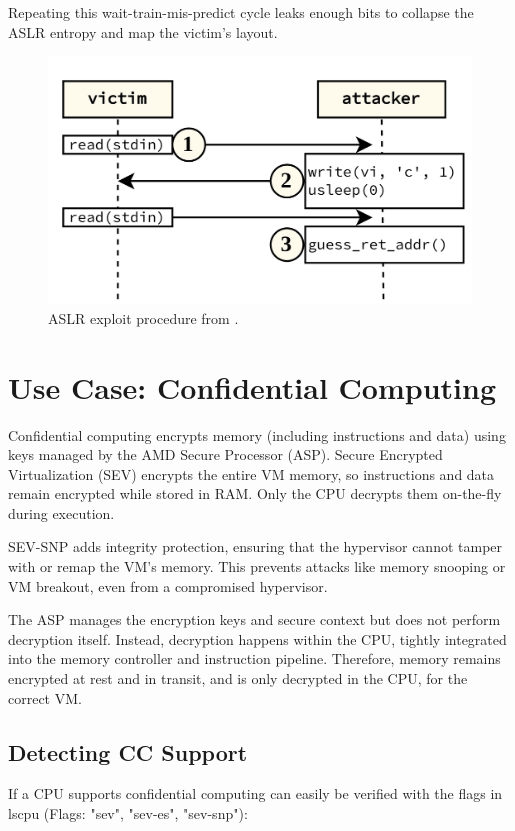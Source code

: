 \documentclass[11pt,a4paper]{article}
\begin{document}
Repeating this wait-train-mis-predict cycle leaks enough bits to collapse the ASLR entropy and map the victim’s layout.

\begin{figure}[htb]
  \centering
  \includegraphics[width=\textwidth]{img/example.png}
  \caption{ASLR exploit procedure from \cite{wikner25}.}
  \label{fig:cache-hit}
\end{figure}

\section{Use Case: Confidential Computing}
Confidential computing encrypts memory (including instructions and data) using keys managed by the AMD Secure Processor (ASP). Secure Encrypted Virtualization (SEV) encrypts the entire VM memory, so instructions and data remain encrypted while stored in RAM. Only the CPU decrypts them on-the-fly during execution.

SEV-SNP adds integrity protection, ensuring that the hypervisor cannot tamper with or remap the VM's memory. This prevents attacks like memory snooping or VM breakout, even from a compromised hypervisor.

The ASP manages the encryption keys and secure context but does not perform decryption itself. Instead, decryption happens within the CPU, tightly integrated into the memory controller and instruction pipeline. Therefore, memory remains encrypted at rest and in transit, and is only decrypted in the CPU, for the correct VM.
\clearpage

\subsection{Detecting CC Support}
If a CPU supports confidential computing can easily be verified with the flags in lscpu (Flags: "sev", "sev-es", "sev-snp"):
\end{document}
